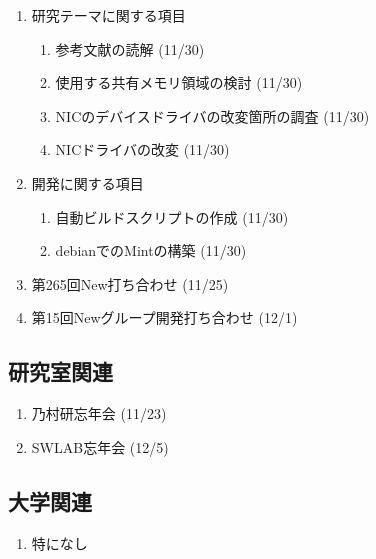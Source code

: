 \documentclass[fleqn, 14pt]{extarticle}
\begin{document}
\begin{enumerate}
\item 研究テーマに関する項目
\hfill
\begin{enumerate}


\item 参考文献の読解
\hfill
(11/30)

\item 使用する共有メモリ領域の検討
\hfill
(11/30)

\item NICのデバイスドライバの改変箇所の調査
\hfill
(11/30)

\item NICドライバの改変
\hfill
(11/30)

\end{enumerate}
\item 開発に関する項目
\hfill
\begin{enumerate}

\item 自動ビルドスクリプトの作成
\hfill
(11/30)

\item debianでのMintの構築
\hfill
(11/30)

\end{enumerate}
\item 第265回New打ち合わせ
\hfill
\label{enum-7}
(11/25)
\item 第15回Newグループ開発打ち合わせ
\hfill
\label{enum-8}
(12/1)
\end{enumerate}

\subsection{研究室関連}
\label{sec-4-2}

\begin{enumerate}


\item 乃村研忘年会
\hfill
\label{enum-12}
(11/23)

\item SWLAB忘年会
\hfill
\label{enum-13}
(12/5)
\end{enumerate}

\subsection{大学関連}
\begin{enumerate}
\item 特になし
\end{enumerate}
\end{document}
